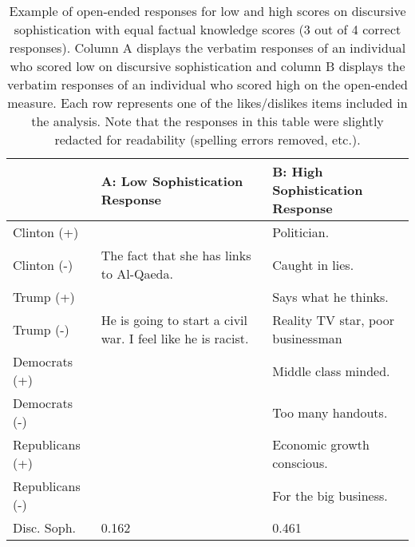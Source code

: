 \begin{table}[ht]\footnotesize\centering
\begin{tabular}{l|p{6.3cm}|p{6.3cm}}
\toprule
	& A: Low Sophistication Response & B: High Sophistication Response \\ \midrule
Clinton (+)		& 																& Politician. \\\hdashline
Clinton (-)		& The fact that she has links to Al-Qaeda. 						& Caught in lies. \\\hdashline
Trump (+)		& 																& Says what he thinks. \\\hdashline
Trump (-)		& He is going to start a civil war. I feel like he is racist. 	& Reality TV star, poor businessman \\\hdashline
Democrats (+)	& 																& Middle class minded. \\\hdashline
Democrats (-)	& 																& Too many handouts. \\\hdashline
Republicans (+)	& 																& Economic growth conscious. \\\hdashline
Republicans (-)	& 																& For the big business. \\\midrule
Disc. Soph. 	& 0.162 														& 0.461 \\\bottomrule

 \end{tabular}
\caption{Example of open-ended responses for low and high scores on discursive sophistication with equal factual knowledge scores (3 out of 4 correct responses). Column A displays the verbatim responses of an individual who scored low on discursive sophistication and column B displays the verbatim responses of an individual who scored high on the open-ended measure. Each row represents one of the likes/dislikes items included in the analysis. Note that the responses in this table were slightly redacted for readability (spelling errors removed, etc.).}\label{tab:ex1}
\end{table}

